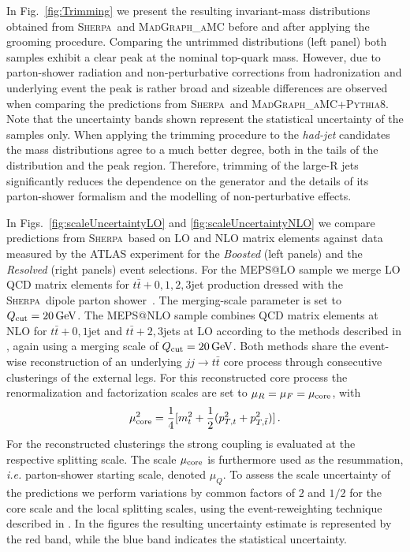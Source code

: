 \documentclass[aps,prd,amsmath,amssymb,superscriptaddress, preprintnumbers,preprint,nofootinbib,a4paper]{revtex4}
\makeatletter
\def\Sherpa{\textsc{Sherpa}}
\def\mg5{\textsc{MadGraph\_aMC\@NLO}}
\makeatother
\begin{document}
In Fig.~\ref{fig:Trimming} we present the resulting invariant-mass distributions obtained from \Sherpa\ and \mg5
before and after applying the grooming procedure. Comparing the untrimmed distributions (left panel) both samples
exhibit a clear peak at the nominal top-quark mass. However, due to parton-shower radiation and non-perturbative
corrections from hadronization and underlying event the peak is rather broad and sizeable differences are observed
when comparing the predictions from \Sherpa\ and \mg5+\textsc{Pythia}8. Note that the uncertainty bands shown represent
the statistical uncertainty of the samples only. When applying the trimming procedure to the \emph{had-jet} candidates
the mass distributions agree to a much better degree, both in the tails of the distribution and the peak region. Therefore,
trimming of the large-R jets significantly reduces the dependence on the generator and the details of its parton-shower
formalism and the modelling of non-perturbative effects. 

In Figs.~\ref{fig:scaleUncertaintyLO} and \ref{fig:scaleUncertaintyNLO} we compare predictions from \Sherpa\ based on
LO and NLO matrix elements against data measured by the ATLAS experiment for the \emph{Boosted} (left panels) and the
\emph{Resolved} (right panels) event selections. For the MEPS@LO sample we merge LO QCD matrix elements for
$t\bar{t}+0,1,2,3$jet production dressed with the \Sherpa\ dipole parton shower~\cite{Hoeche:2009rj}. The merging-scale
parameter is set to $Q_{\rm cut}=20\,{\rm GeV}$. The MEPS@NLO sample combines QCD matrix elements at NLO for
$t\bar{t}+0,1$jet and $t\bar{t}+2,3$jets at LO according to the methods described in
\cite{Hoche:2010kg,Hoeche:2012yf}, again using a merging scale of $Q_{\rm cut}=20\,{\rm GeV}$. Both methods share
the event-wise reconstruction of an underlying $jj\to t\bar t$ core process through consecutive clusterings of the
external legs. For this reconstructed core process the renormalization and factorization scales are set
to $\mu_R=\mu_F=\mu_{\rm core}$, with
%
\begin{equation}
\mu^2_{\rm core} = \frac14 [ m_t^2 + \frac12 (p_{T,t}^2 + p_{T,\bar{t}}^2) ]\,.
\end{equation}
%
For the reconstructed clusterings the strong coupling is evaluated at the respective splitting scale. The
scale $\mu_{\rm core}$ is furthermore used as the resummation, \emph{i.e.} parton-shower starting scale, denoted $\mu_Q$. To
assess the scale uncertainty of the predictions we perform variations by common factors of $2$ and $1/2$ for
the core scale and the local splitting scales, using the event-reweighting technique described in
\cite{Bothmann:2016nao}. In the figures the resulting uncertainty estimate is represented by the red band, while
the blue band indicates the statistical uncertainty.
\end{document}

